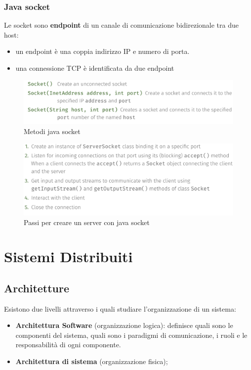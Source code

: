 \documentclass[12pt]{article}
\begin{document}
	\subsubsection{Java socket}
		Le socket sono \textbf{endpoint} di un canale di comunicazione bidirezionale tra due host:
		\begin{itemize}
			\item un endpoint è una coppia indirizzo IP e numero di porta.
			\item una connessione TCP è identificata da due endpoint
		\end{itemize}
		\begin{figure}[h!]
			\centering
			\includegraphics[scale=0.30]{img/soc.png}
			\caption{Metodi java socket}
		\end{figure}
		\begin{figure}[h!]
			\centering
			\includegraphics[scale=0.30]{img/echo.png}
			\caption{Passi per creare un server con java socket}
		\end{figure}
		
\section{Sistemi Distribuiti }
	\subsection{Architetture}
	Esistono due livelli attraverso i quali studiare l'organizzazione di un sistema:
	\begin{itemize}
		\item \textbf{Architettura Software} (organizzazione logica): definisce quali sono le componenti del sistema, quali sono i paradigmi di comunicazione, i ruoli e le responsabilità di ogni componente.
		\item \textbf{Architettura di sistema} (organizzazione fisica); 
	\end{itemize}
\end{document}
